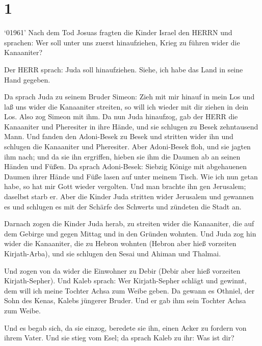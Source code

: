 \hypertarget{section}{%
\section{1}\label{section}}

 `01961' Nach dem Tod Josuas fragten die Kinder Israel den
HERRN und sprachen: Wer soll unter uns zuerst hinaufziehen, Krieg zu
führen wider die Kanaaniter?

 Der HERR sprach: Juda soll hinaufziehen. Siehe, ich habe
das Land in seine Hand gegeben.

 Da sprach Juda zu seinem Bruder Simeon: Zieh mit mir hinauf
in mein Los und laß uns wider die Kanaaniter streiten, so will ich
wieder mit dir ziehen in dein Los. Also zog Simeon mit ihm. 
Da nun Juda hinaufzog, gab der HERR die Kanaaniter und Pheresiter in
ihre Hände, und sie schlugen zu Besek zehntausend Mann.  Und
fanden den Adoni-Besek zu Besek und stritten wider ihn und schlugen die
Kanaaniter und Pheresiter.  Aber Adoni-Besek floh, und sie
jagten ihm nach; und da sie ihn ergriffen, hieben sie ihm die Daumen ab
an seinen Händen und Füßen.  Da sprach Adoni-Besek: Siebzig
Könige mit abgehauenen Daumen ihrer Hände und Füße lasen auf unter
meinem Tisch. Wie ich nun getan habe, so hat mir Gott wieder vergolten.
Und man brachte ihn gen Jerusalem; daselbst starb er.  Aber
die Kinder Juda stritten wider Jerusalem und gewannen es und schlugen es
mit der Schärfe des Schwerts und zündeten die Stadt an.

 Darnach zogen die Kinder Juda herab, zu streiten wider die
Kanaaniter, die auf dem Gebirge und gegen Mittag und in den Gründen
wohnten.  Und Juda zog hin wider die Kanaaniter, die zu
Hebron wohnten (Hebron aber hieß vorzeiten Kirjath-Arba), und sie
schlugen den Sesai und Ahiman und Thalmai.

 Und zogen von da wider die Einwohner zu Debir (Debir aber
hieß vorzeiten Kirjath-Sepher).  Und Kaleb sprach: Wer
Kirjath-Sepher schlägt und gewinnt, dem will ich meine Tochter Achsa zum
Weibe geben.  Da gewann es Othniel, der Sohn des Kenas,
Kalebs jüngerer Bruder. Und er gab ihm sein Tochter Achsa zum Weibe.

 Und es begab sich, da sie einzog, beredete sie ihn, einen
Acker zu fordern von ihrem Vater. Und sie stieg vom Esel; da sprach
Kaleb zu ihr: Was ist dir?

